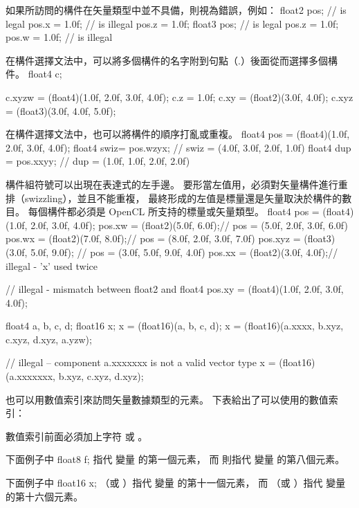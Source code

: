 如果所訪問的構件在矢量類型中並不具備，則視為錯誤，例如：
\startclc
float2 pos;	// is legal
pos.x = 1.0f;	// is illegal
pos.z = 1.0f;
float3 pos;	// is legal
pos.z = 1.0f;
pos.w = 1.0f;	// is illegal
\stopclc

在構件選擇文法中，可以將多個構件的名字附到句點（.）後面從而選擇多個構件。
\startclc
float4 c;

c.xyzw = (float4)(1.0f, 2.0f, 3.0f, 4.0f);
c.z = 1.0f;
c.xy = (float2)(3.0f, 4.0f);
c.xyz = (float3)(3.0f, 4.0f, 5.0f);
\stopclc

在構件選擇文法中，也可以將構件的順序打亂或重複。
\startclc
float4 pos = (float4)(1.0f, 2.0f, 3.0f, 4.0f);
float4 swiz= pos.wzyx; // swiz = (4.0f, 3.0f, 2.0f, 1.0f)
float4 dup = pos.xxyy; // dup = (1.0f, 1.0f, 2.0f, 2.0f)
\stopclc

構件組符號可以出現在表達式的左手邊。
要形當左值用，必須對矢量構件進行重排（swizzling），並且不能重複，
最終形成的左值是標量還是矢量取決於構件的數目。
每個構件都必須是 OpenCL 所支持的標量或矢量類型。
\startclc
float4 pos = (float4)(1.0f, 2.0f, 3.0f, 4.0f);
pos.xw = (float2)(5.0f, 6.0f);// pos = (5.0f, 2.0f, 3.0f, 6.0f)
pos.wx = (float2)(7.0f, 8.0f);// pos = (8.0f, 2.0f, 3.0f, 7.0f)
pos.xyz = (float3)(3.0f, 5.0f, 9.0f); // pos = (3.0f, 5.0f, 9.0f, 4.0f)
pos.xx = (float2)(3.0f, 4.0f);// illegal - 'x' used twice

// illegal - mismatch between float2 and float4
pos.xy = (float4)(1.0f, 2.0f, 3.0f, 4.0f);

float4 a, b, c, d;
float16 x;
x = (float16)(a, b, c, d);
x = (float16)(a.xxxx, b.xyz, c.xyz, d.xyz, a.yzw);

// illegal – component a.xxxxxxx is not a valid vector type
x = (float16)(a.xxxxxxx, b.xyz, c.xyz, d.xyz);
\stopclc

也可以用數值索引來訪問矢量數據類型的元素。
下表給出了可以使用的數值索引：

{}

數值索引前面必須加上字符  或 。

下面例子中
\startclc
float8	f;
\stopclc
{} 指代  變量  的第一個元素，
而  則指代  變量  的第八個元素。

下面例子中
\startclc
float16	x;
\stopclc
{} （或 ）指代  變量  的第十一個元素，
而  （或 ）指代  變量  的第十六個元素。

